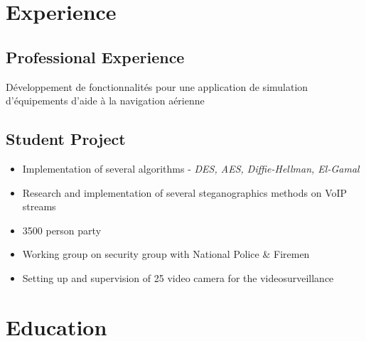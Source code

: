 \documentclass[11pt,a4paper,francais]{moderncv}
\begin{document}
\maketitle
\vspace*{-3\baselineskip}

\section{Experience}
\subsection{Professional Experience}
{Développement de fonctionnalités pour une application de simulation d'équipements d'aide à la navigation 
aérienne}

\subsection{Student Project}
{
\begin{itemize}
 \item Implementation of several algorithms - \textit{DES, AES, Diffie-Hellman, El-Gamal}
 \item Research and implementation of several steganographics methods on VoIP streams
\end{itemize}
}
{
\begin{itemize}
  \item 3500 person party
  \item Working group on security group with National Police \& Firemen 
  \item Setting up and supervision of 25 video camera for the videosurveillance
\end{itemize}
}


\section{Education}
\end{document}
